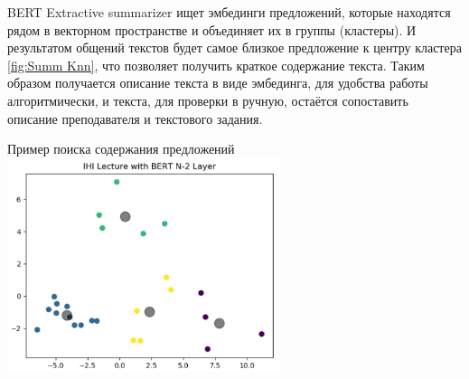 \documentclass[PI,KR]{HSEUniversity}
\begin{document}
BERT Extractive summarizer ищет эмбединги предложений, которые находятся рядом в векторном пространстве и объединяет их в группы (кластеры). И результатом общений текстов будет самое близкое предложение к центру кластера \ref{fig:Summ Knn}, что позволяет получить краткое содержание текста. Таким образом получается описание текста в виде эмбединга, для удобства работы алгоритмически, и текста, для проверки в ручную, остаётся сопоставить описание преподавателя и текстового задания.

\begin{FIGURE}[h]{Пример поиска содержания предложений \label{fig:Summ Knn}}
	\includegraphics[width=0.6\textwidth]{img/Summ Knn}
\end{FIGURE}
\end{document}
